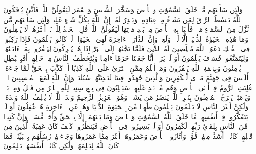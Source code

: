 \startbuffer[\q:29:61]
وَلَئِن سَأَلۡتَهُم مَّنۡ خَلَقَ ٱلسَّمَٰوَٰتِ وَٱلۡأَرۡضَ وَسَخَّرَ ٱلشَّمۡسَ وَٱلۡقَمَرَ لَیَقُولُنَّ ٱللَّهُۖ فَأَنَّىٰ یُؤۡفَكُونَ%
\stopbuffer
\startbuffer[\q:29:62]
ٱللَّهُ یَبۡسُطُ ٱلرِّزۡقَ لِمَن یَشَاۤءُ مِنۡ عِبَادِهِۦ وَیَقۡدِرُ لَهُۥۤۚ إِنَّ ٱللَّهَ بِكُلِّ شَیۡءٍ عَلِیمࣱ%
\stopbuffer
\startbuffer[\q:29:63]
وَلَئِن سَأَلۡتَهُم مَّن نَّزَّلَ مِنَ ٱلسَّمَاۤءِ مَاۤءࣰ فَأَحۡیَا بِهِ ٱلۡأَرۡضَ مِنۢ بَعۡدِ مَوۡتِهَا لَیَقُولُنَّ ٱللَّهُۚ قُلِ ٱلۡحَمۡدُ لِلَّهِۚ بَلۡ أَكۡثَرُهُمۡ لَا یَعۡقِلُونَ%
\stopbuffer
\startbuffer[\q:29:64]
وَمَا هَٰذِهِ ٱلۡحَیَوٰةُ ٱلدُّنۡیَاۤ إِلَّا لَهۡوࣱ وَلَعِبࣱۚ وَإِنَّ ٱلدَّارَ ٱلۡءَاخِرَةَ لَهِیَ ٱلۡحَیَوَانُۚ لَوۡ كَانُوا۟ یَعۡلَمُونَ%
\stopbuffer
\startbuffer[\q:29:65]
فَإِذَا رَكِبُوا۟ فِی ٱلۡفُلۡكِ دَعَوُا۟ ٱللَّهَ مُخۡلِصِینَ لَهُ ٱلدِّینَ فَلَمَّا نَجَّىٰهُمۡ إِلَى ٱلۡبَرِّ إِذَا هُمۡ یُشۡرِكُونَ%
\stopbuffer
\startbuffer[\q:29:66]
لِیَكۡفُرُوا۟ بِمَاۤ ءَاتَیۡنَٰهُمۡ وَلِیَتَمَتَّعُوا۟ۚ فَسَوۡفَ یَعۡلَمُونَ%
\stopbuffer
\startbuffer[\q:29:67]
أَوَ لَمۡ یَرَوۡا۟ أَنَّا جَعَلۡنَا حَرَمًا ءَامِنࣰا وَیُتَخَطَّفُ ٱلنَّاسُ مِنۡ حَوۡلِهِمۡۚ أَفَبِٱلۡبَٰطِلِ یُؤۡمِنُونَ وَبِنِعۡمَةِ ٱللَّهِ یَكۡفُرُونَ%
\stopbuffer
\startbuffer[\q:29:68]
وَمَنۡ أَظۡلَمُ مِمَّنِ ٱفۡتَرَىٰ عَلَى ٱللَّهِ كَذِبًا أَوۡ كَذَّبَ بِٱلۡحَقِّ لَمَّا جَاۤءَهُۥۤۚ أَلَیۡسَ فِی جَهَنَّمَ مَثۡوࣰى لِّلۡكَٰفِرِینَ%
\stopbuffer
\startbuffer[\q:29:69]
وَٱلَّذِینَ جَٰهَدُوا۟ فِینَا لَنَهۡدِیَنَّهُمۡ سُبُلَنَاۚ وَإِنَّ ٱللَّهَ لَمَعَ ٱلۡمُحۡسِنِینَ%
\stopbuffer
\startbuffer[\q:30:1]
الۤمۤ%
\stopbuffer
\startbuffer[\q:30:2]
غُلِبَتِ ٱلرُّومُ%
\stopbuffer
\startbuffer[\q:30:3]
فِیۤ أَدۡنَى ٱلۡأَرۡضِ وَهُم مِّنۢ بَعۡدِ غَلَبِهِمۡ سَیَغۡلِبُونَ%
\stopbuffer
\startbuffer[\q:30:4]
فِی بِضۡعِ سِنِینَۗ لِلَّهِ ٱلۡأَمۡرُ مِن قَبۡلُ وَمِنۢ بَعۡدُۚ وَیَوۡمَئِذࣲ یَفۡرَحُ ٱلۡمُؤۡمِنُونَ%
\stopbuffer
\startbuffer[\q:30:5]
بِنَصۡرِ ٱللَّهِۚ یَنصُرُ مَن یَشَاۤءُۖ وَهُوَ ٱلۡعَزِیزُ ٱلرَّحِیمُ%
\stopbuffer
\startbuffer[\q:30:6]
وَعۡدَ ٱللَّهِۖ لَا یُخۡلِفُ ٱللَّهُ وَعۡدَهُۥ وَلَٰكِنَّ أَكۡثَرَ ٱلنَّاسِ لَا یَعۡلَمُونَ%
\stopbuffer
\startbuffer[\q:30:7]
یَعۡلَمُونَ ظَٰهِرࣰا مِّنَ ٱلۡحَیَوٰةِ ٱلدُّنۡیَا وَهُمۡ عَنِ ٱلۡءَاخِرَةِ هُمۡ غَٰفِلُونَ%
\stopbuffer
\startbuffer[\q:30:8]
أَوَ لَمۡ یَتَفَكَّرُوا۟ فِیۤ أَنفُسِهِمۗ مَّا خَلَقَ ٱللَّهُ ٱلسَّمَٰوَٰتِ وَٱلۡأَرۡضَ وَمَا بَیۡنَهُمَاۤ إِلَّا بِٱلۡحَقِّ وَأَجَلࣲ مُّسَمࣰّىۗ وَإِنَّ كَثِیرࣰا مِّنَ ٱلنَّاسِ بِلِقَاۤئِ رَبِّهِمۡ لَكَٰفِرُونَ%
\stopbuffer
\startbuffer[\q:30:9]
أَوَ لَمۡ یَسِیرُوا۟ فِی ٱلۡأَرۡضِ فَیَنظُرُوا۟ كَیۡفَ كَانَ عَٰقِبَةُ ٱلَّذِینَ مِن قَبۡلِهِمۡۚ كَانُوۤا۟ أَشَدَّ مِنۡهُمۡ قُوَّةࣰ وَأَثَارُوا۟ ٱلۡأَرۡضَ وَعَمَرُوهَاۤ أَكۡثَرَ مِمَّا عَمَرُوهَا وَجَاۤءَتۡهُمۡ رُسُلُهُم بِٱلۡبَیِّنَٰتِۖ فَمَا كَانَ ٱللَّهُ لِیَظۡلِمَهُمۡ وَلَٰكِن كَانُوۤا۟ أَنفُسَهُمۡ یَظۡلِمُونَ%
